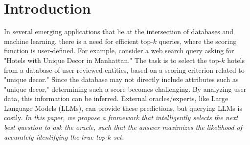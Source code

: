 \section{Introduction}
In several emerging applications that lie at the intersection of databases and machine learning, there is a need for efficient top-$k$ queries, where the scoring function is user-defined. For example, consider a web search query asking for "Hotels with Unique Decor in Manhattan." The task is to select the top-$k$ hotels from a database of user-reviewed entities, based on a scoring criterion related to "unique decor." Since the database may not directly include attributes such as "unique decor," determining such a score becomes challenging. By analyzing user data, this information can be inferred. External oracles/experts, like Large Language Models (LLMs), can provide these predictions, but querying LLMs is costly. \textit{In this paper, we propose a framework that intelligently selects the next best question to ask the oracle, such that the answer maximizes the likelihood of accurately identifying the true top-$k$ set. }




